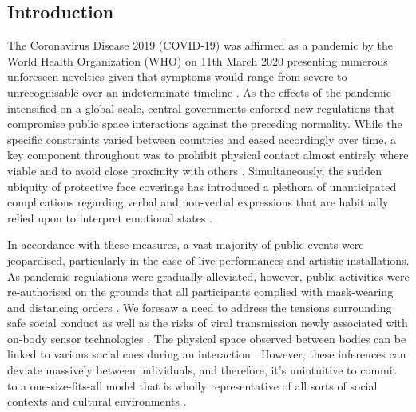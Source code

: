 \subsection{Introduction}

The Coronavirus Disease 2019 (COVID-19) was affirmed as a pandemic by the World Health Organization (WHO) on 11th March 2020 \citep{cucinotta_who_2020} presenting numerous unforeseen novelties given that symptoms would range from severe to unrecognisable over an indeterminate timeline \citep{woelfel_clinical_2020}. As the effects of the pandemic intensified on a global scale, central governments enforced new regulations that compromise public space interactions against the preceding normality. While the specific constraints varied between countries and eased accordingly over time, a key component throughout was to prohibit physical contact almost entirely where viable and to avoid close proximity with others \citep{toquero_challenges_2020, uk_department_of_health_and_social_care_coronavirus_2020}. Simultaneously, the sudden ubiquity of protective face coverings has introduced a plethora of unanticipated complications regarding verbal and non-verbal expressions that are habitually relied upon to interpret emotional states \citep{marta_i_2020,carbon_wearing_2020,grundmann_face_2020}.

In accordance with these measures, a vast majority of public events were jeopardised, particularly in the case of live performances and artistic installations. As pandemic regulations were gradually alleviated, however, public activities were re-authorised on the grounds that all participants complied with mask-wearing and distancing orders \citep{direcao-geral_da_saude_dgs_covid-19_2020}. We foresaw a need to address the tensions surrounding safe social conduct as well as the risks of viral transmission newly associated with on-body sensor technologies \citep{seshadri_wearable_2020,jeong_continuous_2020}. The physical space observed between bodies can be linked to various social cues during an interaction \citep{kroczek_interpersonal_2020,vinciarelli_towards_2011,sundstrom_interpersonal_1976}. However, these inferences can deviate massively between individuals, and therefore, it’s unintuitive to commit to a one-size-fits-all model that is wholly representative of all sorts of social contexts and cultural environments \citep{yu_investigation_2020,sorokowska_preferred_2017}.

